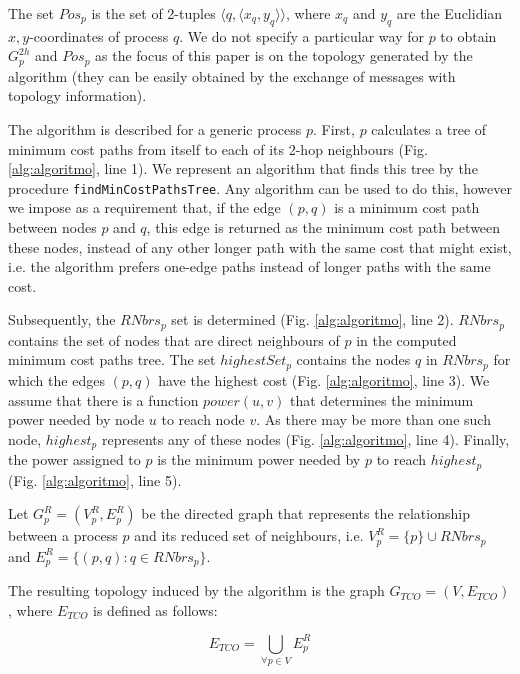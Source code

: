 \documentclass{llncs}
\begin{document}
The set $Pos_p$ is the set of 2-tuples $\langle q, \langle x_q, y_q \rangle \rangle$, where $x_q$ and $y_q$
are the Euclidian $x,y$-coordinates of process $q$. We do not specify a particular way for $p$ to obtain $G^{2h}_p$ and
$Pos_p$ as the focus of this paper is on the topology generated by the algorithm (they can be easily
obtained by the exchange of messages with topology information).

The algorithm is described for a generic process $p$.
First, $p$ calculates a tree of minimum cost paths from itself to each of its 2-hop neighbours (Fig. \ref{alg:algoritmo}, line 1). We represent an algorithm that finds this tree
by the procedure \verb|findMinCostPathsTree|. Any algorithm can be used to do this, however we impose as a requirement that,
if the edge $(p, q)$ is a minimum cost path between nodes $p$ and $q$, this edge is returned as the minimum cost path between
these nodes, instead of any other longer path with the same cost that might exist, i.e. the algorithm prefers one-edge paths instead of longer paths with the same
cost.

Subsequently, the $RNbrs_p$ set is determined (Fig. \ref{alg:algoritmo}, line 2). $RNbrs_p$ contains the set of nodes that are direct neighbours of $p$ in the computed
minimum cost paths tree. The set $highestSet_p$ contains the nodes $q$ in $RNbrs_p$ for which the edges $(p, q)$ have the highest cost (Fig. \ref{alg:algoritmo}, line 3).
We assume that there is a function $power(u, v)$ that determines the minimum power needed by node $u$ to reach node $v$.
As there may be more than one such node, $highest_p$ represents any of these nodes (Fig. \ref{alg:algoritmo}, line 4). Finally, the power assigned to $p$
is the minimum power needed by $p$ to reach $highest_p$ (Fig. \ref{alg:algoritmo}, line 5). 

Let $G_p^R = (V_p^R, E_p^R)$ be the directed graph that represents the relationship between
a process $p$ and its reduced set of neighbours, i.e. $V_p^R = \{p\} \cup RNbrs_p$
and $E_p^R = \{(p, q) : q \in RNbrs_p\}$. 

The resulting topology induced by the algorithm is the graph \linebreak \mbox{$G_{TCO}=(V, E_{TCO})$}, where $E_{TCO}$ is
defined as follows:
\begin{center}
\begin{displaymath}
E_{TCO} = \bigcup_{\forall p \in V}{E_p^R}
\end{displaymath}
\end{center}
\end{document}
